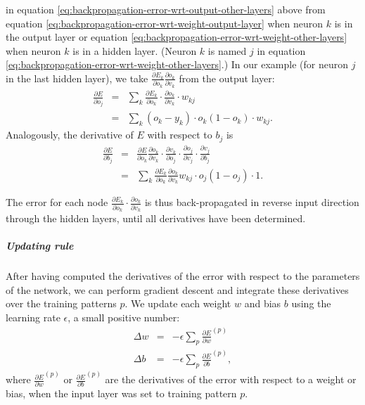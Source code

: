 in equation \ref{eq:backpropagation-error-wrt-output-other-layers}
above from equation \ref{eq:backpropagation-error-wrt-weight-output-layer}
when neuron $k$ is in the output layer or equation \ref{eq:backpropagation-error-wrt-weight-other-layers}
when neuron $k$ is in a hidden layer. (Neuron $k$ is named $j$
in equation \ref{eq:backpropagation-error-wrt-weight-other-layers}.)
In our example (for neuron $j$ in the last hidden layer), we take
$\frac{\partial E_{k}}{\partial o_{k}}\frac{\partial o_{k}}{\partial v_{k}}$
from the output layer: 
\begin{eqnarray}
\frac{\partial E}{\partial o_{j}} & = & \sum_{k}\frac{\partial E_{k}}{\partial o_{k}}\cdot\frac{\partial o_{k}}{\partial v_{k}}\cdot w_{kj}\\
 & = & \sum_{k}(o_{k}-y_{k})\cdot o_{k}(1-o_{k})\cdot w_{kj}.\nonumber 
\end{eqnarray}
Analogously, the derivative of $E$ with respect to $b_{j}$ is 
\begin{eqnarray}
\frac{\partial E}{\partial b_{j}} & = & \frac{\partial E}{\partial o_{k}}\frac{\partial o_{k}}{\partial v_{k}}\cdot\frac{\partial v_{k}}{\partial o_{j}}\cdot\frac{\partial o_{j}}{\partial v_{j}}\cdot\frac{\partial v_{j}}{\partial b_{j}}\\
 & = & \sum_{k}\frac{\partial E_{k}}{\partial o_{k}}\frac{\partial o_{k}}{\partial v_{k}}w_{kj}\cdot o_{j}(1-o_{j})\cdot1.\nonumber 
\end{eqnarray}

The error for each node $\frac{\partial E_{k}}{\partial o_{k}}\cdot\frac{\partial o_{k}}{\partial v_{k}}$
is thus back-propagated in reverse input direction through the hidden
layers, until all derivatives have been determined.

\subparagraph{Updating rule}

After having computed the derivatives of the error with respect to
the parameters of the network, we can perform gradient descent and
integrate these derivatives over the training patterns $p$. We update
each weight $w$ and bias $b$ using the learning rate
$\epsilon$, a small positive number:
\begin{eqnarray}
\Delta w & = & -\epsilon\sum_{p}\frac{\partial E}{\partial w}^{(p)}\\
\Delta b & = & -\epsilon\sum_{p}\frac{\partial E}{\partial b}^{(p)},\nonumber 
\end{eqnarray}
where $\frac{\partial E}{\partial w}^{(p)}$ or $\frac{\partial E}{\partial b}^{(p)}$
are the derivatives of the error with respect to a weight or bias,
when the input layer was set to training pattern $p$.

